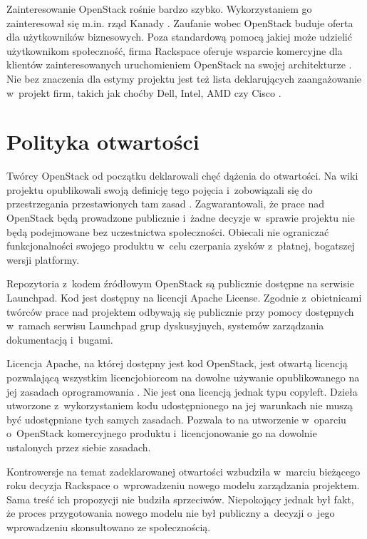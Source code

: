 \documentclass[a4paper,12pt]{article}
\begin{document}
	Zainteresowanie OpenStack rośnie bardzo szybko. Wykorzystaniem go
	zainteresował się m.in. rząd Kanady \cite{computerworld_bort}. Zaufanie
	wobec OpenStack buduje oferta dla użytkowników biznesowych. Poza
	standardową pomocą jakiej może udzielić użytkownikom społeczność, firma
	Rackspace oferuje wsparcie komercyjne dla klientów zainteresowanych
	uruchomieniem OpenStack na swojej architekturze
	\cite{openstack_goes_commercial}. Nie bez znaczenia dla estymy projektu jest
	też lista deklarujących zaangażowanie w~projekt firm, takich jak choćby
	Dell, Intel, AMD czy Cisco \cite{openstack}.

	\section{Polityka otwartości}

	Twórcy OpenStack od początku deklarowali chęć dążenia do otwartości. Na wiki
	projektu opublikowali swoją definicję tego pojęcia i~zobowiązali się do
	przestrzegania przestawionych tam zasad \cite{openness}. Zagwarantowali, że
	prace nad OpenStack będą prowadzone publicznie i~żadne decyzje w~sprawie
	projektu nie będą podejmowane bez uczestnictwa społeczności. Obiecali
	nie ograniczać funkcjonalności swojego produktu w~celu czerpania zysków
	z~płatnej, bogatszej wersji platformy.

	Repozytoria z~kodem źródłowym OpenStack są publicznie dostępne na serwisie
	Launchpad. Kod jest dostępny na licencji Apache License. Zgodnie
	z~obietnicami twórców prace nad projektem odbywają się publicznie przy
	pomocy dostępnych w~ramach serwisu Launchpad grup dyskusyjnych, systemów
	zarządzania dokumentacją i~bugami.

	Licencja Apache, na której dostępny jest kod OpenStack, jest otwartą
	licencją pozwalającą wszystkim licencjobiorcom na dowolne używanie
	opublikowanego na jej zasadach oprogramowania \cite{apache_license_faq}. Nie
	jest ona licencją jednak typu copyleft. Dzieła utworzone z~wykorzystaniem
	kodu udostępnionego na jej warunkach nie muszą być udostępniane tych samych
	zasadach. Pozwala to na utworzenie w~oparciu o~OpenStack komercyjnego
	produktu i~licencjonowanie go na dowolnie ustalonych przez siebie zasadach.

	Kontrowersje na temat zadeklarowanej otwartości wzbudziła w~marciu bieżącego
	roku decyzja Rackspace o~wprowadzeniu nowego modelu zarządzania projektem.
	Sama treść ich propozycji nie budziła sprzeciwów. Niepokojący jednak był
	fakt, że proces przygotowania nowego modelu nie był publiczny a~decyzji
	o~jego wprowadzeniu skonsultowano ze społecznością.
\end{document}
